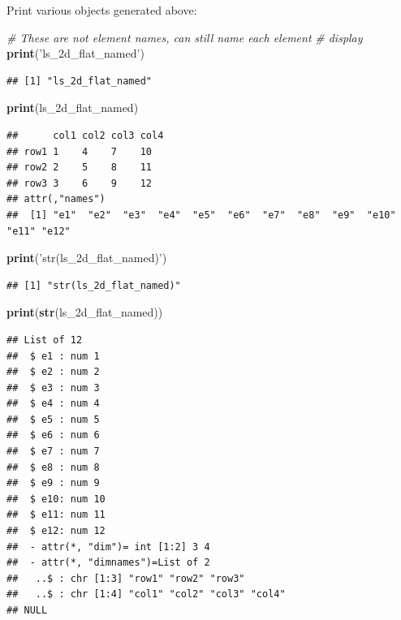\documentclass[
]{book}
\newenvironment{Shaded}{\begin{snugshade}}{\end{snugshade}}
\newcommand{\CommentTok}[1]{\textcolor[rgb]{0.56,0.35,0.01}{\textit{#1}}}
\newcommand{\KeywordTok}[1]{\textcolor[rgb]{0.13,0.29,0.53}{\textbf{#1}}}
\newcommand{\NormalTok}[1]{#1}
\newcommand{\StringTok}[1]{\textcolor[rgb]{0.31,0.60,0.02}{#1}}
\begin{document}
Print various objects generated above:

\begin{Shaded}
\begin{Highlighting}[]
\CommentTok{# These are not element names, can still name each element}
\CommentTok{# display}
\KeywordTok{print}\NormalTok{(}\StringTok{'ls_2d_flat_named'}\NormalTok{)}
\end{Highlighting}
\end{Shaded}

\begin{verbatim}
## [1] "ls_2d_flat_named"
\end{verbatim}

\begin{Shaded}
\begin{Highlighting}[]
\KeywordTok{print}\NormalTok{(ls_2d_flat_named)}
\end{Highlighting}
\end{Shaded}

\begin{verbatim}
##      col1 col2 col3 col4
## row1 1    4    7    10  
## row2 2    5    8    11  
## row3 3    6    9    12  
## attr(,"names")
##  [1] "e1"  "e2"  "e3"  "e4"  "e5"  "e6"  "e7"  "e8"  "e9"  "e10" "e11" "e12"
\end{verbatim}

\begin{Shaded}
\begin{Highlighting}[]
\KeywordTok{print}\NormalTok{(}\StringTok{'str(ls_2d_flat_named)'}\NormalTok{)}
\end{Highlighting}
\end{Shaded}

\begin{verbatim}
## [1] "str(ls_2d_flat_named)"
\end{verbatim}

\begin{Shaded}
\begin{Highlighting}[]
\KeywordTok{print}\NormalTok{(}\KeywordTok{str}\NormalTok{(ls_2d_flat_named))}
\end{Highlighting}
\end{Shaded}

\begin{verbatim}
## List of 12
##  $ e1 : num 1
##  $ e2 : num 2
##  $ e3 : num 3
##  $ e4 : num 4
##  $ e5 : num 5
##  $ e6 : num 6
##  $ e7 : num 7
##  $ e8 : num 8
##  $ e9 : num 9
##  $ e10: num 10
##  $ e11: num 11
##  $ e12: num 12
##  - attr(*, "dim")= int [1:2] 3 4
##  - attr(*, "dimnames")=List of 2
##   ..$ : chr [1:3] "row1" "row2" "row3"
##   ..$ : chr [1:4] "col1" "col2" "col3" "col4"
## NULL
\end{verbatim}
\end{document}
